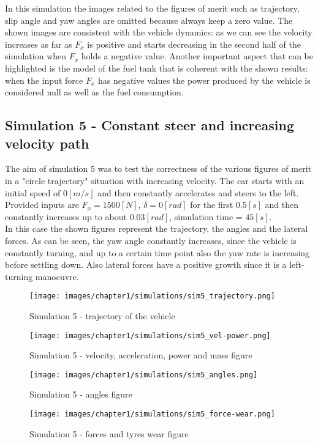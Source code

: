 \documentclass{report}
\let\Oldsubsection\subsection
\renewcommand{\subsection}{\FloatBarrier\Oldsubsection}
\begin{document}
In this simulation the images related to the figures of merit such as trajectory, slip angle and yaw angles are omitted because always keep a zero value. The shown images are consistent with the vehicle dynamics: as we can see the velocity increases as far as $F_x$ is positive and starts decreasing in the second half of the simulation when $F_x$ holds a negative value. Another important aspect that can be highlighted is the model of the fuel tank that is coherent with the shown results: when the input force $F_x$ has negative values the power produced by the vehicle is considered null as well as the fuel consumption.\\

\subsection{Simulation 5 - Constant steer and increasing velocity path}
The aim of simulation 5 was to test the correctness of the various figures of merit in a "circle trajectory" situation with increasing velocity. The car starts with an initial speed of $0[m/s]$ and then constantly accelerates and steers to the left. Provided inputs are $F_x = 1500 [N]$, $\delta = 0 [rad]$ for the first $0.5[s]$ and then constantly increases up to about $0.03 [rad]$, simulation time = $45 [s]$.
\\In this case the shown figures represent the trajectory, the angles and the lateral forces. As can be seen, the yaw angle constantly increases, since the vehicle is constantly turning, and up to a certain time point also the yaw rate is increasing before settling down. Also lateral forces have a positive growth since it is a left-turning manoeuvre.\\ 
\begin{figure}[h!]
    \centering
    \texttt{[image: images/chapter1/simulations/sim5\_trajectory.png]}
    \caption{Simulation 5 - trajectory of the vehicle}
    \label{fig:sim5_1}
\end{figure}
\begin{figure}[h!]
    \centering
    \texttt{[image: images/chapter1/simulations/sim5\_vel-power.png]}
    \caption{Simulation 5 - velocity, acceleration, power and mass figure}
    \label{fig:sim5_2}
\end{figure}
\begin{figure}[h!]
    \centering
    \texttt{[image: images/chapter1/simulations/sim5\_angles.png]}
    \caption{Simulation 5 - angles figure}
    \label{fig:sim5_3}
\end{figure}
\begin{figure}[h!]
    \centering
    \texttt{[image: images/chapter1/simulations/sim5\_force-wear.png]}
    \caption{Simulation 5 - forces and tyres wear figure}
    \label{fig:sim5_4}
\end{figure}
\end{document}
